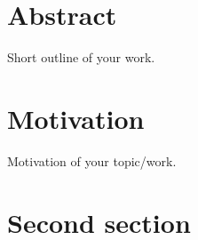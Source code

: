 \documentclass[12pt,english,seminar]{dbvstudentwork}
\begin{document}
  \begin{dbvstudentworkTitlepage}




    \Deadline{\today}


  \end{dbvstudentworkTitlepage}

\section{Abstract} %

  Short outline of your work.

\clearpage
\tableofcontents
\clearpage


\section{Motivation}
\label{sec:motivation}

  Motivation of your topic/work.


\section{Second section}
\label{sec:second}
\end{document}
